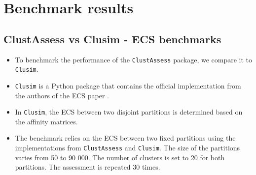 \section{Benchmark results}

\subsection{ClustAssess vs Clusim - ECS benchmarks}

\begin{frame}
    \begin{itemize}[<+->]
        \item To benchmark the performance of the \texttt{ClustAssess} package, we compare it to \texttt{Clusim}. 
        \item \texttt{Clusim} is a Python package that contains the official implementation from the authors of the ECS paper \cite{Gates2019b}.
        \item In \texttt{Clusim}, the ECS between two disjoint partitions is determined based on the affinity matrices.
        \item The benchmark relies on the ECS between two fixed partitions using the implementations from \texttt{ClustAssess} and \texttt{Clusim}. The size of the partitions varies from 50 to 90 000. The number of clusters is set to 20 for both partitions. The assessment is repeated 30 times.
    \end{itemize}
\end{frame}

